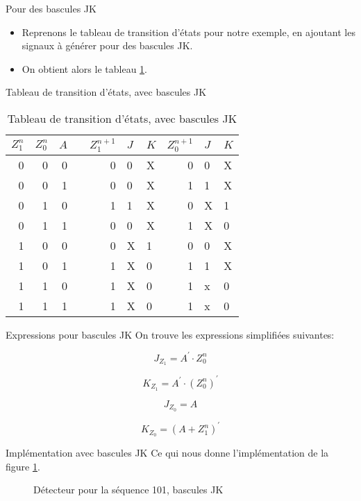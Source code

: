 \documentclass[presentation]{beamer}
\begin{document}
\begin{frame}[label={sec:orgc211739}]{Pour des bascules JK}
\begin{itemize}
\item Reprenons le tableau de transition d'états pour notre exemple, en ajoutant les signaux à générer pour des bascules JK.

\item On obtient alors le tableau \ref{tab:orgdee9807}.
\end{itemize}
\end{frame}

\begin{frame}[label={sec:orgc846999}]{Tableau de transition d'états, avec bascules JK}
\begin{table}[htbp]
\caption{\label{tab:orgdee9807}Tableau de transition d'états, avec bascules JK}
\centering
\begin{tabular}{rrrlrllrll}
\(Z_1^n\) & \(Z_0^n\) & \(A\) &  & \(Z_1^{n+1}\) & \(J\) & \(K\) & \(Z_0^{n+1}\) & \(J\) & \(K\)\\
\hline
0 & 0 & 0 &  & 0 & 0 & X & 0 & 0 & X\\
0 & 0 & 1 &  & 0 & 0 & X & 1 & 1 & X\\
0 & 1 & 0 &  & 1 & 1 & X & 0 & X & 1\\
0 & 1 & 1 &  & 0 & 0 & X & 1 & X & 0\\
1 & 0 & 0 &  & 0 & X & 1 & 0 & 0 & X\\
1 & 0 & 1 &  & 1 & X & 0 & 1 & 1 & X\\
1 & 1 & 0 &  & 1 & X & 0 & 1 & x & 0\\
1 & 1 & 1 &  & 1 & X & 0 & 1 & x & 0\\
\end{tabular}
\end{table}
\end{frame}

\begin{frame}[label={sec:org03d521a}]{Expressions pour bascules JK}
On trouve les expressions simplifiées suivantes:

$$ J_{Z_1} = A^\prime \cdot Z_0^n $$

$$ K_{Z_1} = A^\prime \cdot (Z_0^n)^\prime $$

$$ J_{Z_0} = A $$ 

$$ K_{Z_0} = (A + Z_1^n)^\prime $$
\end{frame}

\begin{frame}[label={sec:orge06ad30}]{Implémentation avec bascules JK}
Ce qui nous donne l'implémentation de la figure \ref{fig:org7fa4862}.

\begin{figure}[htbp]
\centering

\caption{\label{fig:org7fa4862}Détecteur pour la séquence 101, bascules JK}
\end{figure}
\end{frame}
\end{document}
